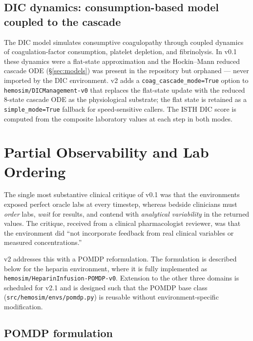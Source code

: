 \documentclass[11pt]{article}
\begin{document}
\subsection{DIC dynamics: consumption-based model coupled to the cascade}
\label{sec:cascade}

The DIC model simulates consumptive coagulopathy through coupled dynamics of coagulation-factor consumption, platelet depletion, and fibrinolysis. In v0.1 these dynamics were a flat-state approximation and the Hockin--Mann reduced cascade ODE (\S\ref{sec:models}) was present in the repository but orphaned --- never imported by the DIC environment. v2 adds a \texttt{coag\_cascade\_mode=True} option to \texttt{hemosim/DICManagement-v0} that replaces the flat-state update with the reduced 8-state cascade ODE as the physiological substrate; the flat state is retained as a \texttt{simple\_mode=True} fallback for speed-sensitive callers. The ISTH DIC score \citep{taylor2001} is computed from the composite laboratory values at each step in both modes.

\section{Partial Observability and Lab Ordering}
\label{sec:pomdp}

The single most substantive clinical critique of v0.1 was that the environments exposed perfect oracle labs at every timestep, whereas bedside clinicians must \emph{order} labs, \emph{wait} for results, and contend with \emph{analytical variability} in the returned values. The critique, received from a clinical pharmacologist reviewer, was that the environment did ``not incorporate feedback from real clinical variables or measured concentrations.''

v2 addresses this with a POMDP reformulation. The formulation is described below for the heparin environment, where it is fully implemented as \texttt{hemosim/HeparinInfusion-POMDP-v0}. Extension to the other three domains is scheduled for v2.1 and is designed such that the POMDP base class (\texttt{src/hemosim/envs/pomdp.py}) is reusable without environment-specific modification.

\subsection{POMDP formulation}
\end{document}
